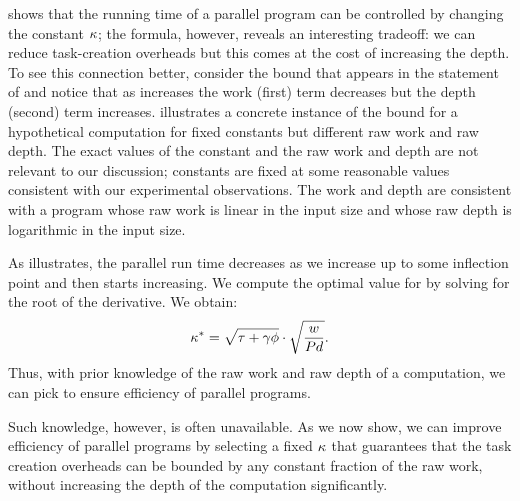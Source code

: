  shows that the running time of a parallel
program can be controlled by changing the constant ${\kappa}$; the
formula, however, reveals an interesting tradeoff: we can reduce
task-creation overheads but this comes at the cost of increasing the
depth.  To see this connection better, consider the bound
that appears in the statement of 
and notice that as \coff increases the work (first) term decreases
but the depth (second) term increases.  
illustrates a concrete instance of the bound for a hypothetical
computation for fixed constants but different raw work and raw depth.
The exact values of the constant and the raw work and depth are not
relevant to our discussion; constants are fixed at some reasonable
values consistent with our experimental observations.  The work and
depth are consistent with a program whose raw work is linear
in the input size
and whose raw depth is logarithmic in the input size.

As  illustrates, the parallel run time
decreases as we increase \coff up to some inflection point and then
starts increasing.  
We compute the optimal value for \coff by solving for the root of the  
derivative. We obtain:
\[
{\kappa}^* = \sqrt{{\tau}+{\gamma}{\phi}} \cdot
\sqrt{ \frac{w}{Pd} }.
\]
Thus, with prior knowledge of the raw work and raw depth of a
computation, we can pick \coff to ensure efficiency of parallel
programs.  

Such knowledge, however, is often unavailable.  As we now
show, we can improve efficiency of parallel programs by selecting a
fixed ${\kappa}$ that guarantees that the task creation overheads can be
bounded by any constant fraction of the raw work, without increasing
the depth of the computation significantly. 




